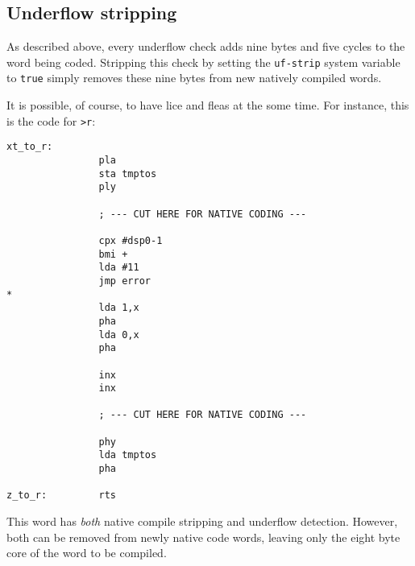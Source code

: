 \subsection{Underflow stripping}

As described above, every underflow check adds nine bytes and five cycles to the
word being coded. Stripping this check by setting the
\texttt{uf-strip} system variable to
\texttt{true} simply removes these nine bytes from new
natively compiled words. 

It is possible, of course, to have lice and fleas at the some time. For
instance, this is the code for \texttt{>r}:

\begin{lstlisting}[frame=lines]
xt_to_r:
                pla
                sta tmptos
                ply

                ; --- CUT HERE FOR NATIVE CODING ---

                cpx #dsp0-1
                bmi +
                lda #11
                jmp error
*
                lda 1,x
                pha
                lda 0,x
                pha

                inx
                inx

                ; --- CUT HERE FOR NATIVE CODING ---

                phy
                lda tmptos
                pha

z_to_r:         rts
\end{lstlisting}

\noindent This word has \textit{both} native compile stripping and underflow
detection. However, both can be removed from newly native code words, leaving
only the eight byte core of the word to be compiled.
